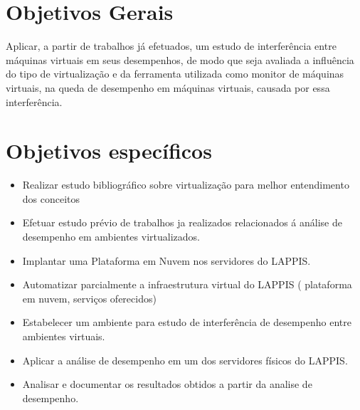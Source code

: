 \section{Objetivos Gerais}

Aplicar, a partir de trabalhos já efetuados, um estudo de interferência entre máquinas virtuais em seus desempenhos, de modo que seja avaliada a influência do tipo de virtualização e da ferramenta utilizada como monitor de máquinas virtuais, na queda de desempenho em máquinas virtuais, causada por essa interferência. 
\section{Objetivos específicos}

\begin{itemize}
\item Realizar estudo bibliográfico sobre virtualização para melhor entendimento dos conceitos
\item Efetuar estudo prévio de trabalhos ja realizados relacionados á análise de desempenho em ambientes virtualizados.
\item Implantar uma Plataforma em Nuvem nos servidores do LAPPIS.
\item Automatizar parcialmente a infraestrutura virtual do LAPPIS ( plataforma em nuvem, serviços oferecidos)
\item Estabelecer um ambiente para estudo de interferência de desempenho entre ambientes virtuais.
\item Aplicar a análise de desempenho em um dos servidores físicos do LAPPIS.
\item Analisar e documentar os resultados obtidos a partir da analise de desempenho.


\end{itemize}

